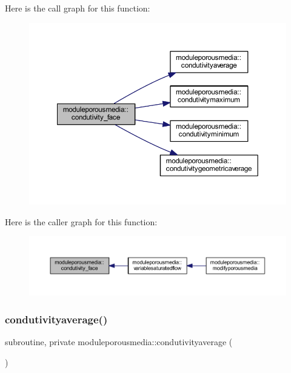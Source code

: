 Here is the call graph for this function\+:\nopagebreak
\begin{figure}[H]
\begin{center}
\leavevmode
\includegraphics[width=350pt]{namespacemoduleporousmedia_a702433cf8268af2b48ad2dff405d1202_cgraph}
\end{center}
\end{figure}
Here is the caller graph for this function\+:\nopagebreak
\begin{figure}[H]
\begin{center}
\leavevmode
\includegraphics[width=350pt]{namespacemoduleporousmedia_a702433cf8268af2b48ad2dff405d1202_icgraph}
\end{center}
\end{figure}
\mbox{\label{namespacemoduleporousmedia_af9319c9dde3c764e53801191ae902220}} 
\subsubsection{\texorpdfstring{condutivityaverage()}{condutivityaverage()}}
{\footnotesize\ttfamily subroutine, private moduleporousmedia\+::condutivityaverage (\begin{DoxyParamCaption}{ }\end{DoxyParamCaption})\hspace{0.3cm}{\ttfamily [private]}}


